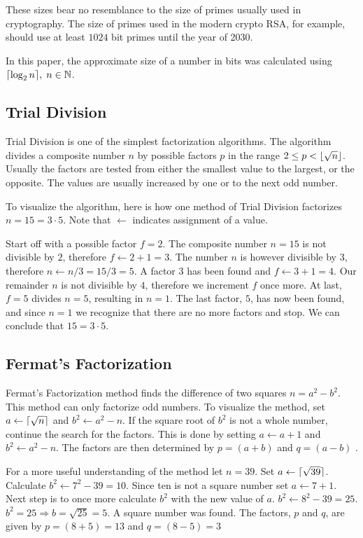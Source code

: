 These sizes bear no resemblance to the size of primes usually used in cryptography. The size of primes used in the modern crypto RSA, for example, should use at least $1024$ bit primes until the year of 2030\cite{keysize}.

In this paper, the approximate size of a number in bits was calculated using $\lceil\log_2{n}\rceil,\;n\in\mathbb{N}$.

\subsection{Trial Division}
Trial Division is one of the simplest factorization algorithms. The algorithm divides a composite number $n$ by possible factors $p$ in the range $2 \leq p < \lfloor\sqrt{n}\rfloor$. Usually the factors are tested from either the smallest value to the largest, or the opposite. The values are usually increased by one or to the next odd number\cite{trialDivisionAndFermats}.

To visualize the algorithm, here is how one method of Trial Division factorizes $n=15=3\cdot5$. Note that $\leftarrow$ indicates assignment of a value.

Start off with a possible factor $f=2$. The composite number $n=15$ is not divisible by $2$, therefore $f\leftarrow2+1=3$. The number $n$ is however divisible by $3$, therefore $n\leftarrow n/3=15/3=5$. A factor $3$ has been found and $f\leftarrow3+1=4$. Our remainder $n$ is not divisible by $4$, therefore we increment $f$ once more. At last, $f=5$ divides $n=5$, resulting in $n=1$. The last factor, $5$, has now been found, and since $n=1$ we recognize that there are no more factors and stop. We can conclude that $15=3\cdot5$.

\subsection{Fermat's Factorization}
Fermat's Factorization method finds the difference of two squares $n = a^2 - b^2$. This method can only factorize odd numbers. To visualize the method, set $a \leftarrow \lceil\sqrt{n}\rceil$ and $b^2 \leftarrow a^2 - n$. If the square root of $b^2$ is not a whole number, continue the search for the factors. This is done by setting $a \leftarrow a + 1$ and $b^2 \leftarrow a^2 - n$. The factors are then determined by $p = (a + b)$ and $q = (a - b)$ \cite{trialDivisionAndFermats}.

For a more useful understanding of the method let $n=39$. Set $a \leftarrow \lceil\sqrt{39}\rceil$. Calculate $b^2 \leftarrow 7^2-39 = 10$. Since ten is not a square number set $a \leftarrow 7+1$. Next step is to once more calculate $b^2$ with the new value of $a$. $b^2 \leftarrow 8^2-39 = 25$. $b^2=25 \Rightarrow b=\sqrt{25} = 5$. A square number was found. The factors, $p$ and $q$, are given by $p=(8+5)=13$ and $q=(8-5)=3$ 

